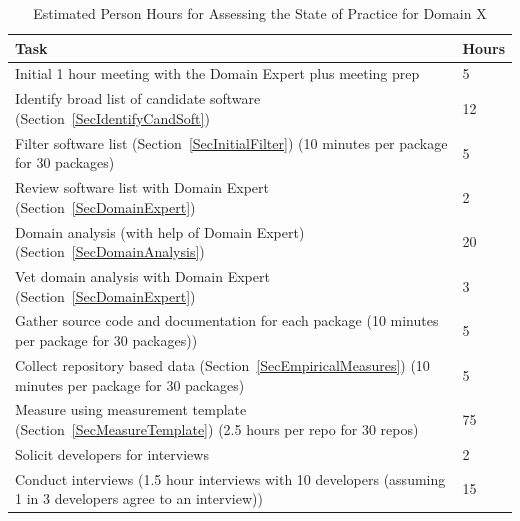 \documentclass[letterpaper,cleveref]{lipics-v2019}
\newcounter{totHours} %
\begin{document}
\begin{table}[h]
  \caption{Estimated Person Hours for Assessing the State of Practice for Domain
  X} \label{TabPersonHours}
  \centering
  \begin{tabular}{p{10cm} l}
    \toprule
    \textbf{Task} & \textbf{Hours} \\
    \midrule

    Initial 1 hour meeting with the Domain Expert plus meeting prep & 5
    \addtocounter{totHours}{5} \\

    Identify broad list of candidate software
    (Section~\ref{SecIdentifyCandSoft}) & 12 \addtocounter{totHours}{12} \\

    Filter software list (Section~\ref{SecInitialFilter}) (10 minutes per
    package for 30 packages) & 5 \addtocounter{totHours}{5} \\

	Review software list with Domain Expert (Section~\ref{SecDomainExpert}) & 2
	\addtocounter{totHours}{2} \\

    Domain analysis (with help of Domain Expert)
    (Section~\ref{SecDomainAnalysis}) & 20 \addtocounter{totHours}{20} \\

	Vet domain analysis with Domain Expert (Section~\ref{SecDomainExpert}) & 3
	\addtocounter{totHours}{3} \\

	Gather source code and documentation for each package (10 minutes per
	package for 30 packages)) & 5 \addtocounter{totHours}{5} \\

    Collect repository based data (Section~\ref{SecEmpiricalMeasures}) (10
    minutes per package for 30 packages) & 5 \addtocounter{totHours}{5} \\

	Measure using measurement template (Section~\ref{SecMeasureTemplate}) (2.5
    hours per repo for 30 repos) & 75 \addtocounter{totHours}{75} \\

    Solicit developers for interviews & 2 \addtocounter{totHours}{2} \\

    Conduct interviews (1.5 hour interviews with 10 developers (assuming 1 in 3
    developers agree to an interview)) & 15 \addtocounter{totHours}{15} \\


\end{tabular}
\end{table}
\end{document}
